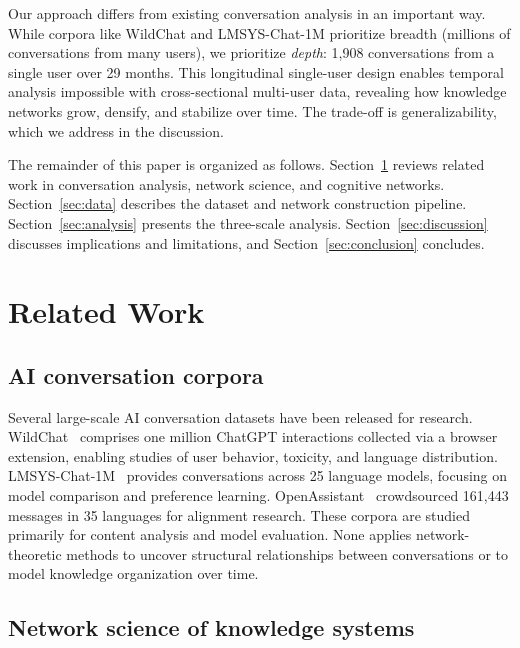 \documentclass[journal]{IEEEtran}
\begin{document}
Our approach differs from existing conversation analysis in an important
way.  While corpora like WildChat and LMSYS-Chat-1M prioritize breadth
(millions of conversations from many users), we prioritize
\emph{depth}: 1,908 conversations from a single user over 29 months.
This longitudinal single-user design enables temporal analysis
impossible with cross-sectional multi-user data, revealing how
knowledge networks grow, densify, and stabilize over time.  The
trade-off is generalizability, which we address in the discussion.

The remainder of this paper is organized as follows.
Section~\ref{sec:related} reviews related work in conversation analysis,
network science, and cognitive networks.  Section~\ref{sec:data}
describes the dataset and network construction pipeline.
Section~\ref{sec:analysis} presents the three-scale analysis.
Section~\ref{sec:discussion} discusses implications and limitations,
and Section~\ref{sec:conclusion} concludes.

\section{Related Work}
\label{sec:related}

\subsection{AI conversation corpora}

Several large-scale AI conversation datasets have been released for
research.  WildChat~\cite{zhao2024wildchat} comprises one million
ChatGPT interactions collected via a browser extension, enabling studies
of user behavior, toxicity, and language distribution.
LMSYS-Chat-1M~\cite{zheng2024lmsys} provides conversations across 25
language models, focusing on model comparison and preference learning.
OpenAssistant~\cite{kopf2023openassistant} crowdsourced 161,443
messages in 35 languages for alignment research.  These corpora are
studied primarily for content analysis and model evaluation. None
applies network-theoretic methods to uncover structural relationships
between conversations or to model knowledge organization over time.

\subsection{Network science of knowledge systems}
\end{document}
